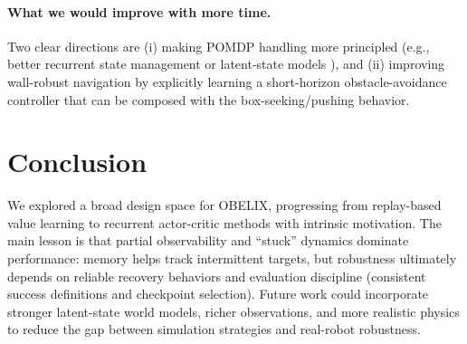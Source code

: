 \documentclass[11pt, oneside]{article}    %
\begin{document}
\paragraph{What we would improve with more time.}
Two clear directions are (i) making POMDP handling more principled (e.g., better recurrent state management or latent-state models \citep{hafner2020dreamer}), and (ii) improving wall-robust navigation by explicitly learning a short-horizon obstacle-avoidance controller that can be composed with the box-seeking/pushing behavior.

\section{Conclusion}
We explored a broad design space for OBELIX, progressing from replay-based value learning to recurrent actor-critic methods with intrinsic motivation. The main lesson is that partial observability and ``stuck'' dynamics dominate performance: memory helps track intermittent targets, but robustness ultimately depends on reliable recovery behaviors and evaluation discipline (consistent success definitions and checkpoint selection). Future work could incorporate stronger latent-state world models, richer observations, and more realistic physics to reduce the gap between simulation strategies and real-robot robustness.
\end{document}
